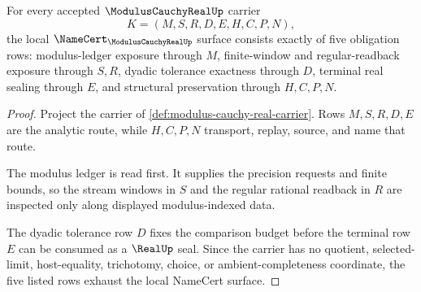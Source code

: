 \begin{theorem}
\label{thm:modulus-cauchy-real-namecert-obligations}
For every accepted $\ModulusCauchyRealUp$ carrier
$$
K=(M,S,R,D,E,H,C,P,N),
$$
the local $\NameCert_{\ModulusCauchyRealUp}$ surface consists exactly of five obligation rows: modulus-ledger exposure through $M$, finite-window and regular-readback exposure through $S,R$, dyadic tolerance exactness through $D$, terminal real sealing through $E$, and structural preservation through $H,C,P,N$.
\end{theorem}
\begin{proof}
Project the carrier of \autoref{def:modulus-cauchy-real-carrier}. Rows $M,S,R,D,E$ are the analytic route, while $H,C,P,N$ transport, replay, source, and name that route.

The modulus ledger is read first. It supplies the precision requests and finite bounds, so the stream windows in $S$ and the regular rational readback in $R$ are inspected only along displayed modulus-indexed data.

The dyadic tolerance row $D$ fixes the comparison budget before the terminal row $E$ can be consumed as a $\RealUp$ seal. Since the carrier has no quotient, selected-limit, host-equality, trichotomy, choice, or ambient-completeness coordinate, the five listed rows exhaust the local NameCert surface.
\end{proof}

